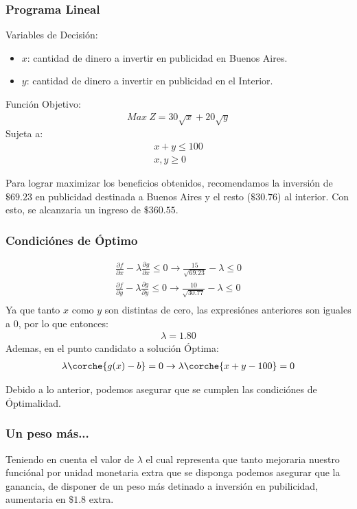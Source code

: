 \begin{homeworkProblem}[-1][Quilmes]

\subsubsection{Programa Lineal}
Variables de Decisión:
\begin{itemize}
    \item $x$: cantidad de dinero a invertir en publicidad en Buenos Aires.
    \item $y$: cantidad de dinero a invertir en publicidad en el Interior.
\end{itemize}
Función Objetivo:
\begin{align*}
    Max\ Z = 30\sqrt{x} + 20\sqrt{y}
\end{align*}
Sujeta a:
\begin{align*}
    x+y\leq 100 \\ x,y\geq0
\end{align*}

Para lograr maximizar los beneficios obtenidos, recomendamos la inversión de $\$69.23$ en publicidad destinada a Buenos Aires y el resto ($\$30.76$) al interior. Con esto, se alcanzaria un ingreso de $\$360.55$.

\subsubsection{Condiciónes de Óptimo}

\begin{align*}
    \frac{\partial f}{\partial x} - \lambda \frac{\partial g}{\partial x} \leq 0 \rightarrow \frac{15}{\sqrt{69.23}} - \lambda \leq 0 \\
    \frac{\partial f}{\partial y} - \lambda \frac{\partial g}{\partial y} \leq 0 \rightarrow \frac{10}{\sqrt{30.77}} - \lambda \leq 0 \\
\end{align*}
Ya que tanto $x$ como $y$ son distintas de cero, las expresiónes anteriores son iguales a $0$, por lo que entonces:
\begin{align*}
    \lambda = 1.80
\end{align*}
Ademas, en el punto candidato a solución Óptima:
\begin{align*}
    \lambda\corche{g(x)-b} = 0 \rightarrow \lambda\corche{x+y-100} = 0
\end{align*}

Debido a lo anterior, podemos asegurar que se cumplen las condiciónes de Óptimalidad.



\subsubsection{Un peso más...}
Teniendo en cuenta el valor de $\lambda$ el cual representa que tanto mejoraria nuestro funciónal por unidad monetaria extra que se disponga
podemos asegurar que la ganancia, de disponer de un peso más detinado a inversión en pubilicidad, aumentaria en $\$1.8$ extra.
\end{homeworkProblem}
